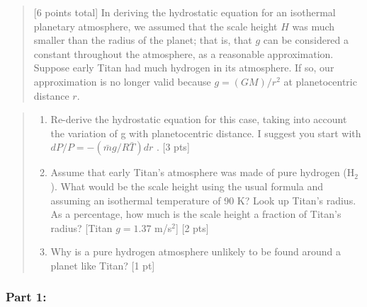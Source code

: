 \documentclass[11pt]{article}
\providecommand{\tightlist}{%
      \setlength{\itemsep}{0pt}\setlength{\parskip}{0pt}}
\begin{document}
\begin{quote}
{[}6 points total{]} In deriving the hydrostatic equation for an
isothermal planetary atmosphere, we assumed that the scale height \(H\)
was much smaller than the radius of the planet; that is, that \(g\) can
be considered a constant throughout the atmosphere, as a reasonable
approximation. Suppose early Titan had much hydrogen in its atmosphere.
If so, our approximation is no longer valid because \(g = (GM)/r^2\) at
planetocentric distance \(r\).
\end{quote}

\begin{quote}
\begin{enumerate}
\def\labelenumi{(\roman{enumi})}
\tightlist
\item
  Re-derive the hydrostatic equation for this case, taking into account
  the variation of g with planetocentric distance. I suggest you start
  with \(dP / P = −(\bar{m}g / R\bar{T} )dr\) . {[}3 pts{]}\\
\item
  Assume that early Titan's atmosphere was made of pure hydrogen
  (H\(_2\)). What would be the scale height using the usual formula and
  assuming an isothermal temperature of 90 K? Look up Titan's radius. As
  a percentage, how much is the scale height a fraction of Titan's
  radius? {[}Titan \(g = 1.37\) m/s\(^2\){]} {[}2 pts{]}\\
\item
  Why is a pure hydrogen atmosphere unlikely to be found around a planet
  like Titan? {[}1 pt{]}
\end{enumerate}
\end{quote}

\subsubsection{Part 1:}\label{part-1}
\end{document}
